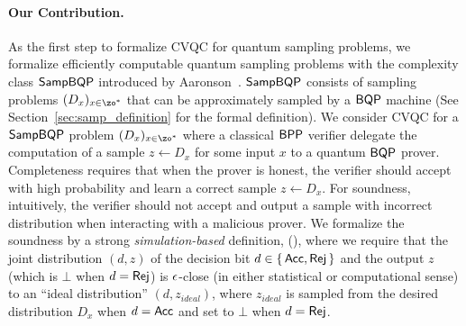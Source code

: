 

\vspace{-3pt}

\paragraph{Our Contribution.}
As the first step to formalize CVQC for quantum sampling problems, we formalize efficiently computable quantum sampling problems with the complexity class $\operatorname{\mathsf{SampBQP}}$ introduced by Aaronson~\cite{aaronson_2013}.  
%
$\operatorname{\mathsf{SampBQP}}$ consists of sampling problems $(D_x)_{x\in\zo^*}$ that can be approximately sampled by a $\operatorname{\mathsf{BQP}}$ machine (See Section~\ref{sec:samp_definition} for the formal definition). We consider CVQC for a $\operatorname{\mathsf{SampBQP}}$ problem $(D_x)_{x\in\zo^*}$ where a classical $\operatorname{\mathsf{BPP}}$ verifier delegate the computation of a sample $z\leftarrow D_x$ for some input $x$ to a quantum $\operatorname{\mathsf{BQP}}$ prover. Completeness requires that when the prover is honest, the verifier should accept with high probability and learn a correct sample $z\leftarrow D_x$. For soundness, intuitively, the verifier should not accept and output a sample with incorrect distribution  when interacting with a malicious prover. We formalize the soundness by a strong \emph{simulation-based} definition, (),
where we require that the joint distribution $(d,z)$ of the decision bit $d \in \set{\mathsf{Acc}, \mathsf{Rej}}$ and the output $z$ (which is $\bot$ when $d = \mathsf{Rej}$) is $\epsilon$-close (in  either statistical or computational sense) to an ``ideal distribution'' $(d,z_{ideal})$, where $z_{ideal}$ is sampled from the desired distribution $D_x$ when $d = \mathsf{Acc}$ and set to $\bot$ when $d = \mathsf{Rej}$.
%

